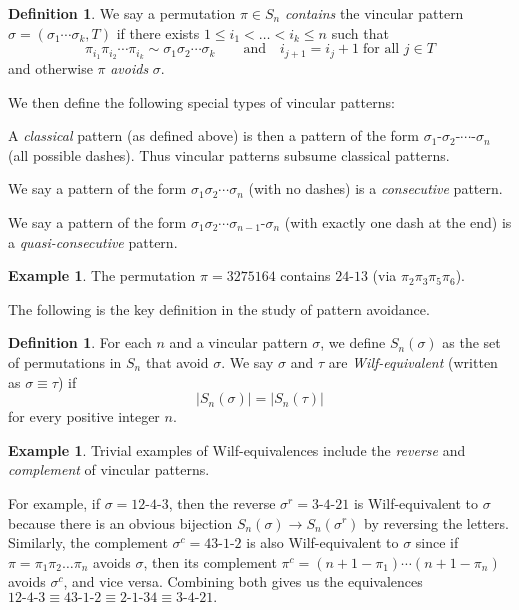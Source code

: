 \documentclass[11pt]{amsart}
\theoremstyle{definition}
\newtheorem{definition}[theorem]{Definition}
\newtheorem{example}[theorem]{Example}
\begin{document}
\begin{definition}
	We say a permutation $\pi \in S_n$ \emph{contains} the vincular pattern
	$\sigma = (\sigma_1\cdots\sigma_k, T)$ if there exists $1 \le i_1 < \dots < i_k \le n$ such that 
	\[ \pi_{i_1} \pi_{i_2} \cdots \pi_{i_k} \sim \sigma_1\sigma_2\cdots\sigma_k
		\qquad \text{and}\quad i_{j+1} = i_j+1 \;
		\text{for all } j \in T  \]
	and otherwise $\pi$ \emph{avoids} $\sigma$.

	We then define the following special types of vincular patterns:
	\begin{itemize}
		{\item} A \emph{classical} pattern (as defined above) is then a pattern
		of the form $\sigma_1 {\text{-}} \sigma_2 {\text{-}} \cdots {\text{-}} \sigma_n$ (all possible dashes).
		Thus vincular patterns subsume classical patterns.
		{\item} We say a pattern of the form $\sigma_1 \sigma_2 \cdots \sigma_n$
		(with no dashes) is a \emph{consecutive} pattern.
		{\item} We say a pattern of the form $\sigma_1 \sigma_2 \cdots \sigma_{n-1}{\text{-}}\sigma_n$
		(with exactly one dash at the end) is a \emph{quasi-consecutive} pattern.
	\end{itemize}
\end{definition}
\begin{example}
	The permutation $\pi = 3275164$ contains $24{\text{-}}13$ (via $\pi_2\pi_3\pi_5\pi_6$).
\end{example}

The following is the key definition in the study of pattern avoidance.
\begin{definition}
	For each $n$ and a vincular pattern $\sigma$,
	we define $S_n(\sigma)$ as the set of permutations in $S_n$ that avoid $\sigma$.
	We say $\sigma$ and $\tau$ are \emph{Wilf-equivalent}
	(written as $\sigma \equiv \tau$) if 
	\[ \left\lvert S_n(\sigma) \right\rvert
		= \left\lvert S_n(\tau) \right\rvert \]
	for every positive integer $n$.
\end{definition}

\begin{example}
	Trivial examples of Wilf-equivalences include the
	\emph{reverse} and \emph{complement} of vincular patterns.  

	For example, if $\sigma = 12{\text{-}}4{\text{-}}3$,
	then the reverse $\sigma^r = 3{\text{-}}4{\text{-}}21$ is Wilf-equivalent to $\sigma$
	because there is an obvious bijection $S_n(\sigma) \to S_n(\sigma^r)$
	by reversing the letters.
	Similarly, the complement $\sigma^c = 43{\text{-}}1{\text{-}}2$ is also
	Wilf-equivalent to $\sigma$ since if $\pi = \pi_1\pi_2\ldots\pi_n$ avoids $\sigma$,
	then its complement $\pi^c = (n+1-\pi_1)\cdots(n+1-\pi_n)$ avoids $\sigma^c$,
	and vice versa.
	Combining both gives us the equivalences
	$12{\text{-}}4{\text{-}}3 \equiv 43{\text{-}}1{\text{-}}2 \equiv 2{\text{-}}1{\text{-}}34 \equiv 3{\text{-}}4{\text{-}}21.$
\end{example}
\end{document}
